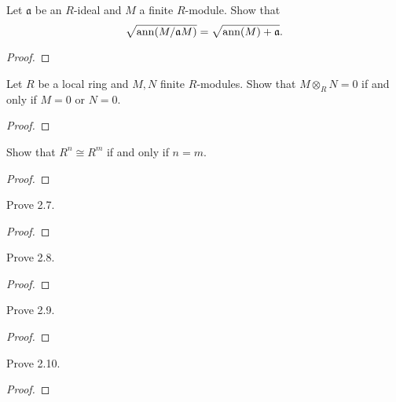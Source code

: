 \begin{problem}
Let $\mathfrak{a}$ be an $R$-ideal and $M$ a finite
$R$-module. Show that
\[
\sqrt{\operatorname{ann}(M/\mathfrak{a}M)}=\sqrt{\operatorname{ann}(M)+\mathfrak{a}}.
\]
\end{problem}
\begin{proof}

\end{proof}
\newpage
\begin{problem}
Let $R$ be a local ring and $M,N$ finite $R$-modules. Show that
$M\otimes_R N=0$ if and only if $M=0$ or $N=0$.
\end{problem}
\begin{proof}
\end{proof}
\newpage
\begin{problem}
Show that $R^n\cong R^m$ if and only if $n=m$.
\end{problem}
\begin{proof}
\end{proof}
\newpage
\begin{problem}
Prove 2.7.
\end{problem}
\begin{proof}
\end{proof}
\newpage
\begin{problem}
Prove 2.8.
\end{problem}
\begin{proof}
\end{proof}
\newpage
\begin{problem}
Prove 2.9.
\end{problem}
\begin{proof}
\end{proof}
\newpage
\begin{problem}
Prove 2.10.
\end{problem}
\begin{proof}
\end{proof}

